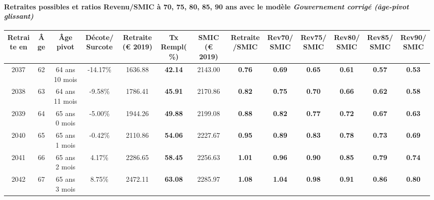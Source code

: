 \paragraph{Retraites possibles et ratios Revenu/SMIC à 70, 75, 80, 85, 90 ans avec le modèle \emph{Gouvernement corrigé (âge-pivot glissant)}}  
 
{ \scriptsize \begin{center} 
\begin{tabular}[htb]{|c|c||c|c||c|c||c||c|c|c|c|c|c|} 
\hline 
 Retraite en &  Âge &  Âge pivot &  Décote/Surcote &  Retraite (\euro{} 2019) &  Tx Rempl(\%) &  SMIC (\euro{} 2019) &  Retraite/SMIC &  Rev70/SMIC &  Rev75/SMIC &  Rev80/SMIC &  Rev85/SMIC &  Rev90/SMIC \\ 
\hline \hline 
 2037 &  62 &  64 ans 10 mois &  -14.17\% &  1636.88 &  {\bf 42.14} &  2143.00 &  {\bf {\color{red} 0.76}} &  {\bf {\color{red} 0.69}} &  {\bf {\color{red} 0.65}} &  {\bf {\color{red} 0.61}} &  {\bf {\color{red} 0.57}} &  {\bf {\color{red} 0.53}} \\ 
\hline 
 2038 &  63 &  64 ans 11 mois &  -9.58\% &  1786.41 &  {\bf 45.91} &  2170.86 &  {\bf {\color{red} 0.82}} &  {\bf {\color{red} 0.75}} &  {\bf {\color{red} 0.70}} &  {\bf {\color{red} 0.66}} &  {\bf {\color{red} 0.62}} &  {\bf {\color{red} 0.58}} \\ 
\hline 
 2039 &  64 &  65 ans 0 mois &  -5.00\% &  1944.26 &  {\bf 49.88} &  2199.08 &  {\bf {\color{red} 0.88}} &  {\bf {\color{red} 0.82}} &  {\bf {\color{red} 0.77}} &  {\bf {\color{red} 0.72}} &  {\bf {\color{red} 0.67}} &  {\bf {\color{red} 0.63}} \\ 
\hline 
 2040 &  65 &  65 ans 1 mois &  -0.42\% &  2110.86 &  {\bf 54.06} &  2227.67 &  {\bf {\color{red} 0.95}} &  {\bf {\color{red} 0.89}} &  {\bf {\color{red} 0.83}} &  {\bf {\color{red} 0.78}} &  {\bf {\color{red} 0.73}} &  {\bf {\color{red} 0.69}} \\ 
\hline 
 2041 &  66 &  65 ans 2 mois &  4.17\% &  2286.65 &  {\bf 58.45} &  2256.63 &  {\bf 1.01} &  {\bf {\color{red} 0.96}} &  {\bf {\color{red} 0.90}} &  {\bf {\color{red} 0.85}} &  {\bf {\color{red} 0.79}} &  {\bf {\color{red} 0.74}} \\ 
\hline 
 2042 &  67 &  65 ans 3 mois &  8.75\% &  2472.11 &  {\bf 63.08} &  2285.97 &  {\bf 1.08} &  {\bf 1.04} &  {\bf {\color{red} 0.98}} &  {\bf {\color{red} 0.91}} &  {\bf {\color{red} 0.86}} &  {\bf {\color{red} 0.80}} \\ 
\hline 
\hline 
\end{tabular} 
\end{center} } 

